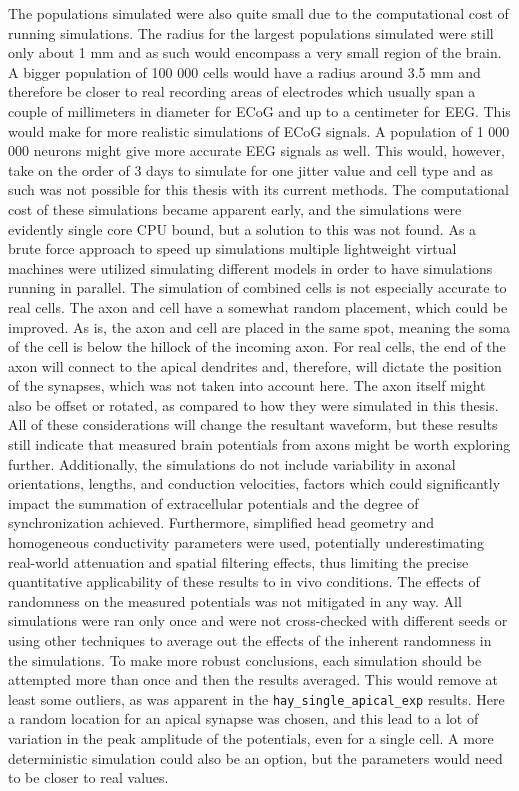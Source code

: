 \documentclass[final, a4paper,masters,en,listoffigures,listoftables,norwegiandates]{NMBU}
\begin{document}
The populations simulated were also quite small due to the computational cost of running simulations. The radius for the largest populations simulated were still only about 1 mm and as such would encompass a very small region of the brain. A bigger population of 100 000 cells would have a radius around 3.5 mm and therefore be closer to real recording areas of electrodes which usually span a couple of millimeters in diameter for ECoG and up to a centimeter for EEG. This would make for more realistic simulations of ECoG signals. A population of 1 000 000 neurons might give more accurate EEG signals as well. This would, however, take on the order of 3 days to simulate for one jitter value and cell type and as such was not possible for this thesis with its current methods. The computational cost of these simulations became apparent early, and the simulations were evidently single core CPU bound, but a solution to this was not found. As a brute force approach to speed up simulations multiple lightweight virtual machines were utilized simulating different models in order to have simulations running in parallel. 
\newline
The simulation of combined cells is not especially accurate to real cells. The axon and cell have a somewhat random placement, which could be improved. As is, the axon and cell are placed in the same spot, meaning the soma of the cell is below the hillock of the incoming axon. For real cells, the end of the axon will connect to the apical dendrites and, therefore, will dictate the position of the synapses, which was not taken into account here. The axon itself might also be offset or rotated, as compared to how they were simulated in this thesis. All of these considerations will change the resultant waveform, but these results still indicate that measured brain potentials from axons might be worth exploring further.
Additionally, the simulations do not include variability in axonal orientations, lengths, and conduction velocities, factors which could significantly impact the summation of extracellular potentials and the degree of synchronization achieved. Furthermore, simplified head geometry and homogeneous conductivity parameters were used, potentially underestimating real-world attenuation and spatial filtering effects, thus limiting the precise quantitative applicability of these results to in vivo conditions.
\newline
The effects of randomness on the measured potentials was not mitigated in any way. All simulations were ran only once and were not cross-checked with different seeds or using other techniques to average out the effects of the inherent randomness in the simulations. To make more robust conclusions, each simulation should be attempted more than once and then the results averaged. This would remove at least some outliers, as was apparent in the \texttt{hay\_single\_apical\_exp} results. Here a random location for an apical synapse was chosen, and this lead to a lot of variation in the peak amplitude of the potentials, even for a single cell. A more deterministic simulation could also be an option, but the parameters would need to be closer to real values.
\end{document}
